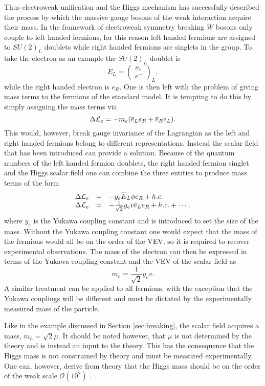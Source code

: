 Thus electroweak unification and the Higgs mechanism has successfully described the process by which the massive gauge bosons of the weak interaction acquire their mass.
In the framework of electroweak symmetry breaking $W$ bosons only couple to left handed fermions, for this reason left handed fermions are assigned to $SU(2)_L$ doublets while right handed fermions are singlets in the group.
To take the electron as an example the $SU(2)_L$ doublet is
\begin{equation}
E_{L} = \begin{pmatrix}\nu_{e} \\ e^{-}\end{pmatrix}_{L},
\end{equation}
while the right handed electron is $e_{R}$.
One is then left with the problem of giving mass terms to the fermions of the standard model. 
It is tempting to do this by simply assigning the mass terms via
\begin{equation}
\Delta\mathcal{L}_{e} = -m_{e}(\overline{e}_{L}e_{R} + \overline{e}_{R}e_{L}).
\end{equation}
This would, however, break gauge invariance of the Lagrangian as the left and right handed fermions belong to different representations.
Instead the scalar field that has been introduced can provide a solution.
Because of the quantum numbers of the left handed fermion doublets, the right handed fermion singlet and the Higgs scalar field one can combine the three entities to produce mass terms of the form
\begin{equation}
\begin{array}{rcl}
\Delta\mathcal{L}_{e} & = & -y_{e}\overline{E}_{L}\phi e_{R} + h.c. \\
\Delta\mathcal{L}_{e} & = & -\frac{1}{\sqrt{2}}y_{e}v\overline{e}_{L} e_{R} + h.c. + \cdots.\\
\end{array}
\end{equation}
where $y_{e}$ is the Yukawa coupling constant and is introduced to set the size of the mass.
Without the Yukawa coupling constant one would expect that the mass of the fermions would all be on the order of the VEV, so it is required to recover experimental observations.
The mass of the electron can then be expressed in terms of the Yukawa coupling constant and the VEV of the scalar field as
\begin{equation}
m_{e} = \frac{1}{\sqrt{2}}y_{e}v.
\end{equation}
A similar treatment can be applied to all fermions, with the exception that the Yukawa couplings will be different and must be dictated by the experimentally measured mass of the particle.

Like in the example discussed in Section \ref{sec:breaking}, the scalar field acquires a mass, $m_{h} = \sqrt{2}\mu$.
It should be noted however, that $\mu$ is not determined by the theory and is instead an input to the theory.
This has the consequence that the Higgs mass is not constrained by theory and must be measured experimentally.
One can, however, derive from theory that the Higgs mass should be on the order of the weak scale $\mathcal{O}(10^{2})$ \cite{PESKIN}. 
